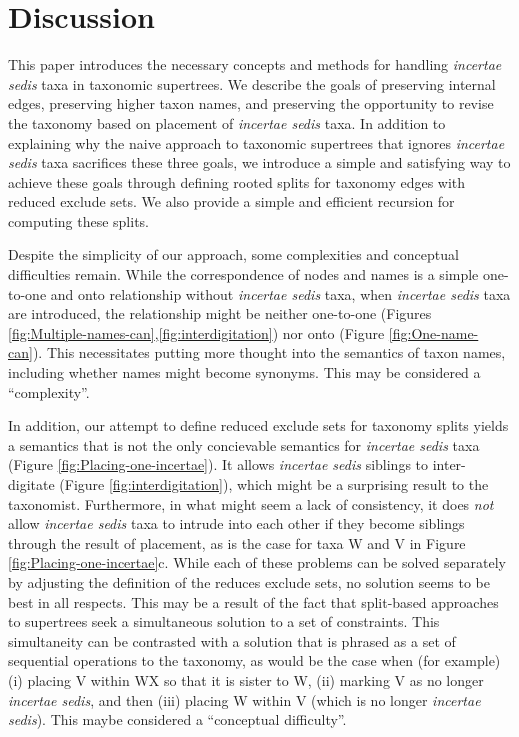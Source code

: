 \documentclass[english]{article}
\begin{document}
\section{Discussion}

This paper introduces the necessary concepts and methods for handling \emph{incertae sedis}
taxa in taxonomic supertrees.
We describe the goals of preserving internal edges,
preserving higher taxon names, and preserving the opportunity to revise the taxonomy
based on placement of \emph{incertae sedis} taxa.
In addition to explaining why
the naive approach to taxonomic supertrees that ignores \emph{incertae sedis}
 taxa sacrifices these three goals, we introduce a simple and satisfying way to achieve these goals
through defining rooted splits for taxonomy edges with reduced exclude sets.
We also
provide a simple and efficient recursion for computing these splits.

Despite the simplicity of our approach, some complexities and conceptual difficulties
remain.
While the correspondence of nodes and names is a simple one-to-one and onto
relationship without \emph{incertae sedis} taxa, when \emph{incertae sedis} taxa are
introduced, the relationship might be neither one-to-one (Figures \ref{fig:Multiple-names-can},\ref{fig:interdigitation}) nor onto (Figure \ref{fig:One-name-can}).
This necessitates putting more thought into the semantics of taxon names, including
whether names might become synonyms.  This may be considered a ``complexity''.

In addition, our attempt to define reduced exclude sets for taxonomy splits yields
a semantics that is not the only concievable semantics for \emph{incertae sedis}
taxa (Figure \ref{fig:Placing-one-incertae}).  It allows \emph{incertae sedis} siblings to inter-digitate
(Figure \ref{fig:interdigitation}), which might be a surprising result to the taxonomist.  Furthermore,
in what might seem a lack of consistency, it does \emph{not} allow \emph{incertae sedis}
taxa to intrude into each other if they become siblings through the result of
placement, as is the case for taxa W and V in Figure \ref{fig:Placing-one-incertae}c.
While each of these problems can be solved separately by adjusting the definition of the
reduces exclude sets, no solution seems to be best in all respects.  This may be a result
of the fact that split-based approaches to supertrees seek a simultaneous solution to a set
of constraints.  This simultaneity can be contrasted with a solution that is phrased
as a set of sequential operations to the taxonomy, as would be the case when (for example)
(i) placing V within WX so that it is sister to W, (ii) marking V as no longer \emph{incertae sedis}, and then (iii)
placing W within V (which is no longer \emph{incertae sedis}).  This maybe considered a ``conceptual difficulty''.
\end{document}
